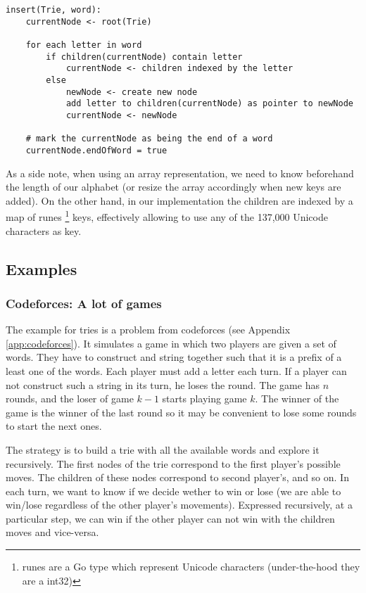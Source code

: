 \documentclass[a4paper,10pt,table,xcdraw]{article}
\begin{document}
\begin{verbatim}
insert(Trie, word):
    currentNode <- root(Trie)
    
    for each letter in word
        if children(currentNode) contain letter
            currentNode <- children indexed by the letter
        else 
            newNode <- create new node
            add letter to children(currentNode) as pointer to newNode
            currentNode <- newNode
            
    # mark the currentNode as being the end of a word
	currentNode.endOfWord = true

\end{verbatim}


As a side note, when using an array representation, we need to know beforehand the length of our alphabet (or resize the array accordingly when new keys are added). On the other hand, in our implementation the children are indexed by a map of runes \footnote{ runes are a Go type which represent Unicode characters (under-the-hood they are a int32)} keys, effectively allowing to use any of the 137,000 Unicode characters as key.

\subsection{Examples}

\subsubsection{Codeforces: A lot of games}
\label{subsubsec:trie-examples} 

The example for tries is a problem from codeforces (see Appendix \ref{app:codeforces}). It simulates a game in which two players are given a set of words. They have to construct and string together such that it is a prefix of a least one of the words. Each player must add a letter each turn. If a player can not construct such a string in its turn, he loses the round. The game has $n$ rounds, and the loser of game $k-1$ starts playing game $k$. The winner of the game is the winner of the last round so it may be convenient to lose some rounds to start the next ones. 

The strategy is to build a trie with all the available words and explore it recursively. The first nodes of the trie correspond to the first player's possible moves. The children of these nodes correspond to second player's, and so on. In each turn, we want to know if we decide wether to win or lose (we are able to win/lose regardless of the other player's movements). Expressed recursively, at a particular step, we can win if the other player can not win with the children moves and vice-versa.
\end{document}

